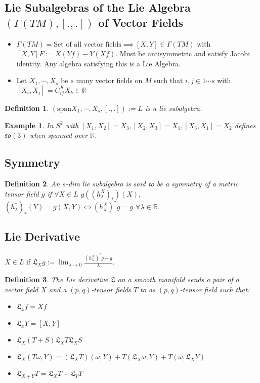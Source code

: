\documentclass[10pt, oneside]{article}
\newcommand{\R}{\mathbb{R}}
\newtheorem{defn}{Definition}
\newtheorem{example}{Example}
\begin{document}
\subsection{Lie Subalgebras of the Lie Algebra $(\Gamma(TM),[.,.])$ of Vector Fields}
\begin{itemize}
\item $\Gamma(TM) = {\text{Set of all vector fields}} \implies [X,Y] \in \Gamma(TM)$ with $[X,Y]F := X(Yf) - Y(Xf)$. Must be antisymmetric and satisfy Jacobi identity. Any algebra satisfying this is a Lie Algebra.
\item Let $X_1,\cdots,X_s$ be $s$ many vector fields on $M$ such that $i,j \in 1 \cdots s$ with $[X_i, X_j] = C^K_{ij} X_k \in \R$
\end{itemize}
\begin{defn}
  $(\text{span}{X_1,\cdots,X_s},[.,.]) := L$ is a lie subalgebra.
\end{defn}
\begin{example}
In $S^2$ with $[X_1,X_2] = X_3, [X_2,X_3] = X_1, [X_3,X_1] = X_2$ defines $\mathfrak{so}(3)$ when spanned over $\R$.
\end{example}
\subsection{Symmetry}
\begin{defn}
An $s$-dim lie subalgebra is said to be a symmetry of a metric tensor field $g$ if $\forall X \in L$ $g ((h_\lambda^X)_*) (X),$
$(h^*_\lambda)_*(Y) = g(X,Y) \iff (h^X_\lambda)^*g = g$ $\forall \lambda \in \R$.
\end{defn}
\subsection{Lie Derivative}
$X \in L$ if $\mathfrak{L}_X g:=\lim_{\lambda \to 0}\frac{(h_\lambda^X)^*g - g}{\lambda}.$
\begin{defn}
The Lie derivative $\mathfrak{L}$ on a smooth manifold sends a pair of a vector field $X$ and a $(p,q)$-tensor fields $T$ to as $(p,q)$-tensor field such that:
\begin{itemize}
  \item $\mathfrak{L}_x f = Xf$
  \item $\mathfrak{L}_x Y = [X,Y]$
  \item $\mathfrak{L}_X(T+S) \mathfrak{L}_X T \mathfrak{L}_X S$
  \item $\mathfrak{L}_X (T\omega,Y) = (\mathfrak{L}_X T)(\omega,Y) + T(\mathfrak{L}_X \omega,Y) + T(\omega,\mathfrak{L}_X Y)$
  \item $\mathfrak{L}_{X+Y} T = \mathfrak{L}_X T + \mathfrak{L}_Y T$
\end{itemize}
\end{defn}
\end{document}
